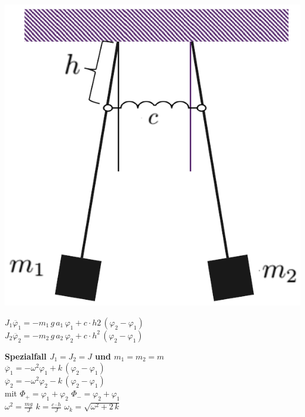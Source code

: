 \begin{minipage}{0.3\linewidth}
\includegraphics[width=0.95\linewidth]{Bilder/Wellen-Optik/gekoppelte_pendel} 
\end{minipage}
\hfill
\begin{minipage}{0.66\linewidth}
$ J_1 \ddot{\varphi_1} = -m_1 \, g \, a_1 \, \varphi_1 + c \cdot h2 \, (\varphi_2 - \varphi_1)$ \\
$ J_2 \ddot{\varphi_2} = -m_2 \, g \,  a_2 \, \varphi_2 + c \cdot h^2 \, (\varphi_2 - \varphi_1)$ \\

\vspace{0.2cm}

\textbf{Spezialfall $J_1 = J_2 = J$ und $m_1 = m_2 = m$} \\

$ \ddot{\varphi_1} = - \omega^2 \varphi_1 + k \, (\varphi_2 - \varphi_1)$ \\
$ \ddot{\varphi_2} = - \omega^2 \varphi_2 - k \, (\varphi_2 - \varphi_1)$ \\

\vspace{0.2cm}
mit $\Phi_+ = \varphi_1 + \varphi_2$ \qquad $\Phi_- = \varphi_2 + \varphi_1$ \\

$ \omega^2 = \frac{mg}{J}$ \qquad $k = \frac{c \cdot h}{J}$ \qquad $\omega_k = \sqrt{\omega^2 + 2 \, k}$ \\
\end{minipage}



